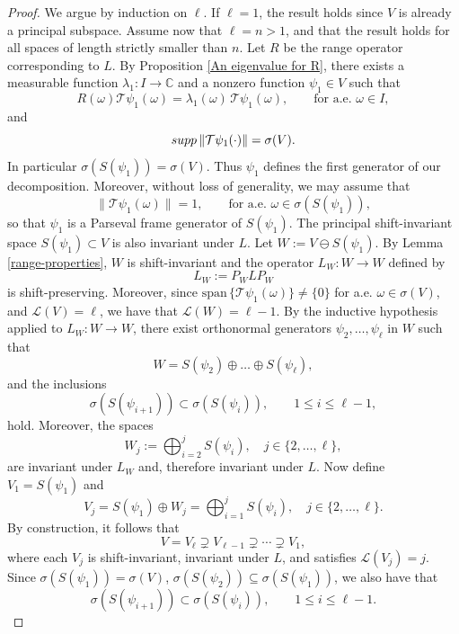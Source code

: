 \documentclass[10pt,a4paper]{amsart}
\def\C{\mathbb{C}}
\def\ele{\mathcal{L}}
\def\la{\lambda}
\def\w{\omega}
\newcommand{\supp}{{\rm supp\,}}
\begin{document}
	\begin{proof} We argue by induction on $\ell$.  If $\ell=1$, the result holds since $V$ is already a principal subspace.  
	Assume now that $\ell=n>1$, and that the result holds for all spaces of length strictly smaller than $n$. 
	Let $R$ be the range operator corresponding to $L$. By Proposition \ref{An eigenvalue for R}, 
	there exists a measurable function $\la_1 :I\to\C$ and a nonzero function $\psi_1\in V$ such that
	$$
	R(\omega)\mathcal T \psi_1(\omega) = \la_1(\omega)\,\mathcal T \psi_1(\omega), 
	\qquad \text{for a.e. }\omega \in I,
	$$
	and 
	$$
	\supp \|\mathcal T \psi_1(\cdot)\| = \sigma(V).
	$$
	In particular $\sigma(S(\psi_1))=\sigma(V)$. Thus $\psi_1$ defines the first generator of our decomposition. Moreover, without loss of generality, we may assume that
	$$
	\|\mathcal T\psi_1(\omega)\|=1, \qquad \text{for a.e. }\omega\in\sigma(S(\psi_1)),
	$$
	so that $\psi_1$ is a Parseval frame generator of $S(\psi_1)$.  
	The principal shift-invariant space
	$
	S(\psi_1)\subset V
	$
	is also invariant under $L$. Let $W:= V\ominus S(\psi_1)$. By Lemma \ref{range-properties}, $W$ is shift-invariant and the operator $L_W:W\to W$ defined by
	$$
	L_W := P_{W} L P_{W}
	$$
	is shift-preserving. Moreover, since $\text{span}\, \{ \mathcal{T} \psi_1 (\w) \}\neq \{0\}$ for a.e. $\w\in \sigma(V)$, and $\ele(V) = \ell$, we have that $\ele(W )= \ell-1$. 
	By the inductive hypothesis applied to $L_W:W\to W$, there exist orthonormal generators $\psi_2,\dots,\psi_\ell$ in $W$ such that
	$$
	W = S(\psi_2)\oplus\dots\oplus S(\psi_\ell),
	$$ 
	and the inclusions 
	$$
	\sigma(S(\psi_{i+1})) \subset \sigma(S(\psi_i)), \qquad 1\le i\le \ell-1,
	$$
	hold. Moreover, the spaces 
	$$
	W_j:= \bigoplus_{i=2}^j S(\psi_i), \quad  j\in \{2,\ldots,\ell\},
	$$
	are invariant under $L_W$ and, therefore invariant under $L$. Now define $V_1= S(\psi_1)$ and
	$$
	V_j= S(\psi_1) \oplus W_j=\bigoplus_{i=1}^{j} S(\psi_i), \quad  j\in \{2,\ldots,\ell\}.
	$$
	By construction, it follows that
	$$
	V = V_\ell \supsetneq V_{\ell-1} \supsetneq \cdots \supsetneq V_{1},
	$$
	where each $V_j$ is shift-invariant, invariant under $L$, and satisfies $\mathcal L(V_j)=j$. 
	Since  $\sigma(S(\psi_1))=\sigma(V)$,  $\sigma(S(\psi_2))\subseteq\sigma(S(\psi_1))$, we also have that
	$$
	\sigma(S(\psi_{i+1})) \subset \sigma(S(\psi_i)), \qquad 1\le i\le \ell-1.
	$$ 
\end{proof}
\end{document}
